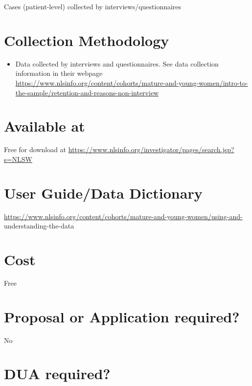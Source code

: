 \documentclass[
]{book}
\providecommand{\tightlist}{%
  \setlength{\itemsep}{0pt}\setlength{\parskip}{0pt}}
\begin{document}
Cases (patient-level) collected by interviews/questionnaires

\hypertarget{collection-methodology-55}{%
\section{Collection Methodology}\label{collection-methodology-55}}

\begin{itemize}
\tightlist
\item
  Data collected by interviews and questionnaires. See data collection information in their webpage
  \url{https://www.nlsinfo.org/content/cohorts/mature-and-young-women/intro-to-the-sample/retention-and-reasons-non-interview}
\end{itemize}

\hypertarget{available-at-55}{%
\section{Available at}\label{available-at-55}}

Free for download at \url{https://www.nlsinfo.org/investigator/pages/search.jsp?s=NLSW}

\hypertarget{user-guidedata-dictionary-55}{%
\section{User Guide/Data Dictionary}\label{user-guidedata-dictionary-55}}

\url{https://www.nlsinfo.org/content/cohorts/mature-and-young-women/using-and-} understanding-the-data

\hypertarget{cost-55}{%
\section{Cost}\label{cost-55}}

Free

\hypertarget{proposal-or-application-required-55}{%
\section{Proposal or Application required?}\label{proposal-or-application-required-55}}

No

\hypertarget{dua-required-55}{%
\section{DUA required?}\label{dua-required-55}}
\end{document}
